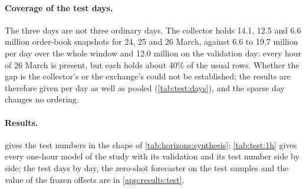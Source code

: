 \paragraph{Coverage of the test days.}  The three days are not three ordinary days.  The
collector holds 14.1, 12.5 and 6.6 million order-book snapshots for 24, 25 and 26 March,
against 6.6 to 19.7 million per day over the whole window and 12.0 million on the
validation day: every hour of 26 March is present, but each holds about 40\% of the usual
rows.  Whether the gap is the collector's or the exchange's could not be established; the
results are therefore given per day as well as pooled (\cref{tab:test:days}), and the sparse
day changes no ordering.

\paragraph{Results.}   gives the test numbers in the shape of
\cref{tab:horizons:synthesis}; \cref{tab:test:1h} gives every one-hour model of the study
with its validation and its test number side by side; the test days by day, the zero-shot
forecaster on the test samples and the value of the frozen offsets are in
\cref{app:results:test}.

